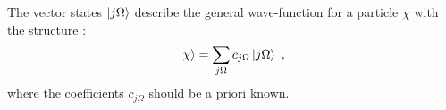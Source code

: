 The vector states $\ket{j\Omega}$ describe the general wave-function for a particle $\chi$ with the structure \cite{hecht1962asymmetric}:
\begin{align}
    \ket{\chi}=\sum_{j\Omega}c_{j\Omega}\ket{j\Omega}\ ,
    \label{j-Omega-single-particle-states}
\end{align}
where the coefficients $c_{j\Omega}$ should be a priori known.
